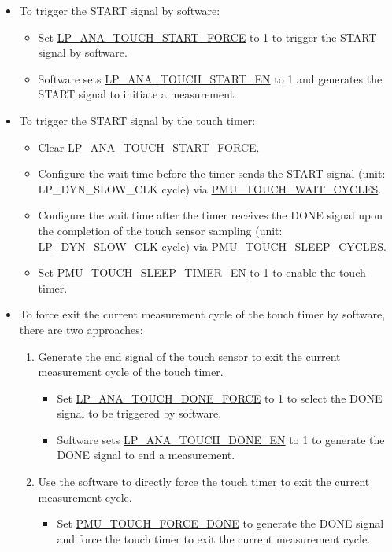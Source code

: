 \documentclass[main\_\_EN.tex]{subfiles}
\begin{document}
\begin{itemize}
    \item To trigger the START signal by software:
    \begin{itemize}
        \item Set \hyperref[fielddesc:LPANATOUCHSTARTFORCE]{LP\_ANA\_TOUCH\_START\_FORCE} to 1 to trigger the START signal by software.
        \item Software sets \hyperref[fielddesc:LPANATOUCHSTARTEN]{LP\_ANA\_TOUCH\_START\_EN} to 1 and generates the START signal to initiate a measurement.
    \end{itemize}
    \item To trigger the START signal by the touch timer:
    \begin{itemize}
        \item Clear \hyperref[fielddesc:LPANATOUCHSTARTFORCE]{LP\_ANA\_TOUCH\_START\_FORCE}.
        \item Configure the wait time before the timer sends the START signal (unit: LP\_DYN\_SLOW\_CLK cycle) via \hyperref[fielddesc:PMUTOUCHWAITCYCLES]{PMU\_TOUCH\_WAIT\_CYCLES}.
        \item Configure the wait time after the timer receives the DONE signal upon the completion of the touch sensor sampling (unit: LP\_DYN\_SLOW\_CLK cycle) via \hyperref[fielddesc:PMUTOUCHSLEEPCYCLES]{PMU\_TOUCH\_SLEEP\_CYCLES}.
        \item Set \hyperref[fielddesc:PMUTOUCHSLEEPTIMEREN]{PMU\_TOUCH\_SLEEP\_TIMER\_EN} to 1 to enable the touch timer.
    \end{itemize}
    \item To force exit the current measurement cycle of the touch timer by software, there are two approaches:
    \begin{enumerate}
        \item Generate the end signal of the touch sensor to exit the current measurement cycle of the touch timer.
        \begin{itemize}
            \item Set \hyperref[fielddesc:LPANATOUCHDONEFORCE]{LP\_ANA\_TOUCH\_DONE\_FORCE} to 1 to select the DONE signal to be triggered by software.
            \item Software sets \hyperref[fielddesc:LPANATOUCHDONEEN]{LP\_ANA\_TOUCH\_DONE\_EN} to 1 to generate the DONE signal to end a measurement.
        \end{itemize}
        \item Use the software to directly force the touch timer to exit the current measurement cycle.
        \begin{itemize}
            \item Set \hyperref[fielddesc:PMUTOUCHFORCEDONE]{PMU\_TOUCH\_FORCE\_DONE} to generate the DONE signal and force the touch timer to exit the current measurement cycle.
        \end{itemize}
    \end{enumerate}


\end{itemize}
\end{document}
